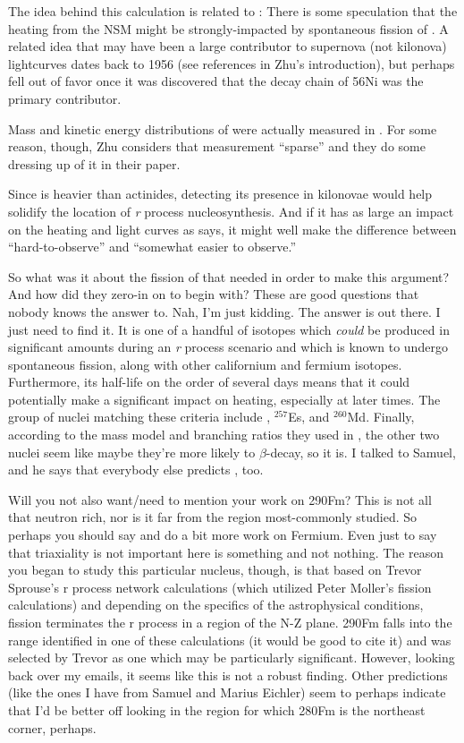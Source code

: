 The idea behind this {\Cf} calculation is related to \cite{Zhu2018}: There is some speculation that the heating from the NSM might be strongly-impacted by spontaneous fission of {\Cf}. A related idea that {\Cf} may have been a large contributor to supernova (not kilonova) lightcurves dates back to 1956 (see references in Zhu's introduction), but perhaps fell out of favor once it was discovered that the decay chain of 56Ni was the primary contributor.

Mass and kinetic energy distributions of {\Cf} were actually measured in \cite{Brandt1963}. For some reason, though, Zhu considers that measurement ``sparse'' and they do some dressing up of it in their paper.

Since {\Cf} is heavier than actinides, detecting its presence in kilonovae would help solidify the location of \textit{r} process nucleosynthesis. And if it has as large an impact on the heating and light curves as \cite{Zhu2018} says, it might well make the difference between ``hard-to-observe'' and ``somewhat easier to observe.''

So what was it about the fission of {\Cf} that \cite{Zhu2018} needed in order to make this argument? And how did they zero-in on {\Cf} to begin with? These are good questions that nobody knows the answer to. Nah, I'm just kidding. The answer is out there. I just need to find it. It is one of a handful of isotopes which \textit{could} be produced in significant amounts during an \textit{r} process scenario and which is known to undergo spontaneous fission, along with other californium and fermium isotopes. Furthermore, its half-life on the order of several days means that it could potentially make a significant impact on heating, especially at later times. The group of nuclei matching these criteria include {\Cf}, $^{257}$Es, and $^{260}$Md. Finally, according to the mass model and branching ratios they used in \cite{Zhu2018}, the other two nuclei seem like maybe they're more likely to $\beta$-decay, so {\Cf} it is. I talked to Samuel, and he says that everybody else predicts {\Cf}, too.

Will you not also want/need to mention your work on 290Fm? This {\Cf} is not all that neutron rich, nor is it far from the region most-commonly studied. So perhaps you should say and do a bit more work on Fermium. Even just to say that triaxiality is not important here is something and not nothing. The reason you began to study this particular nucleus, though, is that based on Trevor Sprouse's r process network calculations (which utilized Peter Moller's fission calculations) and depending on the specifics of the astrophysical conditions, fission terminates the r process in a region of the N-Z plane. 290Fm falls into the range identified in one of these calculations (it would be good to cite it) and was selected by Trevor as one which may be particularly significant. However, looking back over my emails, it seems like this is not a robust finding. Other predictions (like the ones I have from Samuel and Marius Eichler) seem to perhaps indicate that I'd be better off looking in the region for which 280Fm is the northeast corner, perhaps.

